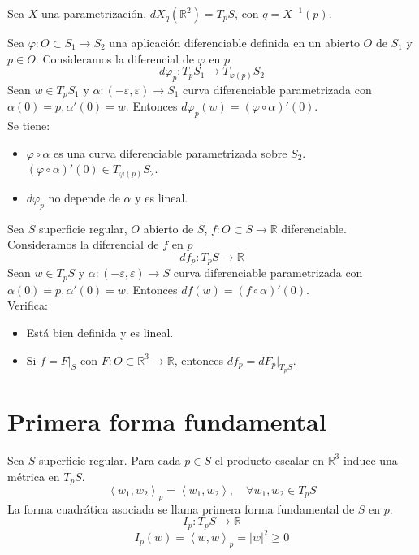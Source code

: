 \begin{proposition}
    Sea $X$ una parametrización, $dX_q(\mathbb{R}^2) = T_pS$, con $q = X^{-1}(p)$.
\end{proposition}

\begin{definition}
    Sea $\varphi : O \subset S_1 \to S_2$ una aplicación diferenciable definida en un abierto $O$ de $S_1$ y $p \in O$.
    Consideramos la diferencial de $\varphi$ en $p$
    $$d\varphi_p : T_pS_1 \to T_{\varphi(p)}S_2$$
    Sean $w \in T_pS_1$ y $\alpha : (-\varepsilon, \varepsilon) \to S_1$ curva diferenciable parametrizada con $\alpha(0) = p, \alpha'(0) = w$.
    Entonces $d\varphi_p(w) = (\varphi \circ \alpha)'(0)$.\\
    Se tiene:
    \begin{itemize}
        \item $\varphi \circ \alpha$ es una curva diferenciable parametrizada sobre $S_2$. $(\varphi \circ \alpha)'(0) \in T_{\varphi(p)}S_2$.
        \item $d\varphi_p$ no depende de $\alpha$ y es lineal.
    \end{itemize}
\end{definition}

\begin{definition}
    Sea $S$ superficie regular, $O$ abierto de $S$, $f : O \subset S \to \mathbb{R}$ diferenciable.
    Consideramos la diferencial de $f$ en $p$
    $$df_p : T_pS \to \mathbb{R}$$
    Sean $w \in T_pS$ y $\alpha : (-\varepsilon, \varepsilon) \to S$ curva diferenciable parametrizada con $\alpha(0) = p, \alpha'(0) = w$.
    Entonces $df(w) = (f \circ \alpha)'(0)$.\\
    Verifica:
    \begin{itemize}
        \item Está bien definida y es lineal.
        \item Si $f = F|_S$ con $F : O \subset \mathbb{R}^3 \to \mathbb{R}$, entonces $df_p = dF_p|_{T_pS}$.
    \end{itemize}
\end{definition}

\section{Primera forma fundamental}

\begin{definition}
    Sea $S$ superficie regular.
    Para cada $p \in S$ el producto escalar en $\mathbb{R}^3$ induce una métrica en $T_pS$.
    $$\left\langle w_1, w_2 \right\rangle _p = \left\langle w_1, w_2 \right\rangle, \quad \forall w_1, w_2 \in T_pS$$
    La forma cuadrática asociada se llama primera forma fundamental de $S$ en $p$.
    $$I_p : T_pS \to \mathbb{R}$$
    $$I_p(w) = \left\langle w, w \right\rangle _p = |w|^2 \geq 0$$
\end{definition}

